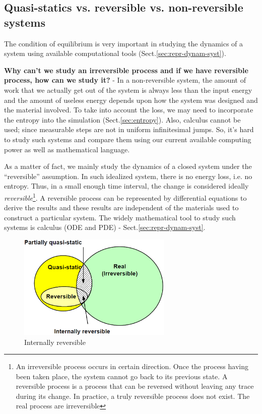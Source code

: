 \subsection[Quasi-statics vs. Reversible vs. Non-reversible]{Quasi-statics vs.
reversible vs. non-reversible systems}
\label{sec:reversible-vs.-non}

The condition of equilibrium is very important in studying the dynamics of a
system using available computational tools (Sect.\ref{sec:repr-dynam-syst}).

{\bf Why can't we study an irreversible process and if we have
  reversible process, how can we study it?}
- In a non-reversible system, the amount of work that we actually get out of the
system is always less than the input energy and the amount of useless energy
depends upon how the system was designed and the material involved. To take into
account the loss, we may need to incorporate the entropy into the simulation
(Sect.\ref{sec:entropy}).
Also, calculus cannot be used; since measurable steps are not in uniform
infinitesimal jumps.  So, it's hard to study such systems and compare them using
our current available computing power as well as mathematical language.

As a matter of fact, we mainly study the dynamics of a closed system under the
``reversible'' assumption. In such idealized system, there is no energy loss,
i.e. no entropy. Thus, in a small enough time interval, the change is considered
ideally {\it
  reversible}\footnote{An irreversible process occurs in certain direction. Once
  the process having been taken place, the system cannot go back to its previous
  state. A reversible process is a process that can be reversed without leaving
  any trace during its change. In practice, a truly reversible process does not
  exist. The real process are irreversible}.
A reversible process can be represented by differential equations to derive the
results and these results are independent of the materials used to construct a
particular system. The widely mathematical tool to study such systems is
calculus (ODE and PDE) - Sect.\ref{sec:repr-dynam-syst}.


\begin{figure}[hbt]
  \centerline{\includegraphics[height=5cm,
    angle=0]{./images/internal_reversible.eps}}
\caption{Internally reversible}
\label{fig:int_reversible}
\end{figure}


